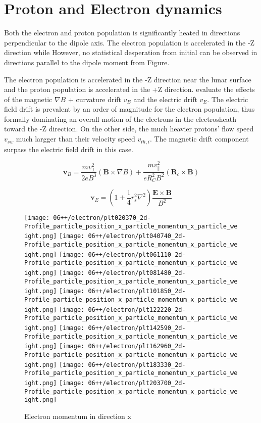 \section{Proton and Electron dynamics}

Both the electron and proton population is significantly heated in directions perpendicular to the dipole axis. The electron population is accelerated in the -Z direction while However, no statistical desperation from initial can be observed in directions parallel to the dipole moment from Figure.

The electron population is accelerated in the -Z direction near the lunar surface and the proton population is accelerated in the +Z direction. \cite{decaGeneralMechanismDynamics2015} evaluate the effects of the magnetic $\nabla B$ + curvature drift $v_B$ and the electric drift $v_E$. The electric field drift is prevalent by an order of magnitude for the electron population, thus formally dominating an overall motion of the electrons in the electrosheath toward the -Z direction. On the other side, the much heavier protons' flow speed $v_{sw}$ much largger than their velocity speed $v_{th,i}$. The magnetic drift component surpass the electric field drift in this case.

$$\boldsymbol{v}_{B}=\frac{m v_{\perp}^{2}}{2 e B^{3}}(\boldsymbol{B} \times \nabla B)+\frac{m v_{\|}^{2}}{e R_{C}^{2} B^{2}}\left(\boldsymbol{R}_{c} \times \boldsymbol{B}\right)$$

$$\boldsymbol{v}_{E}=\left(1+\frac{1}{4} r_{s}^{2} \nabla^{2}\right) \frac{\boldsymbol{E} \times \boldsymbol{B}}{B^{2}}$$

\begin{figure}
  \centering
  {\texttt{[image: 06++/electron/plt020370\_2d-Profile\_particle\_position\_x\_particle\_momentum\_x\_particle\_weight.png]}}
  {\texttt{[image: 06++/electron/plt040740\_2d-Profile\_particle\_position\_x\_particle\_momentum\_x\_particle\_weight.png]}}
  {\texttt{[image: 06++/electron/plt061110\_2d-Profile\_particle\_position\_x\_particle\_momentum\_x\_particle\_weight.png]}}
  {\texttt{[image: 06++/electron/plt081480\_2d-Profile\_particle\_position\_x\_particle\_momentum\_x\_particle\_weight.png]}}
  {\texttt{[image: 06++/electron/plt101850\_2d-Profile\_particle\_position\_x\_particle\_momentum\_x\_particle\_weight.png]}}
  {\texttt{[image: 06++/electron/plt122220\_2d-Profile\_particle\_position\_x\_particle\_momentum\_x\_particle\_weight.png]}}
  {\texttt{[image: 06++/electron/plt142590\_2d-Profile\_particle\_position\_x\_particle\_momentum\_x\_particle\_weight.png]}}
  {\texttt{[image: 06++/electron/plt162960\_2d-Profile\_particle\_position\_x\_particle\_momentum\_x\_particle\_weight.png]}}
  {\texttt{[image: 06++/electron/plt183330\_2d-Profile\_particle\_position\_x\_particle\_momentum\_x\_particle\_weight.png]}}
  {\texttt{[image: 06++/electron/plt203700\_2d-Profile\_particle\_position\_x\_particle\_momentum\_x\_particle\_weight.png]}}
  \caption{Electron momentum in direction x}\label{fig:06++_e_vx}
\end{figure}


